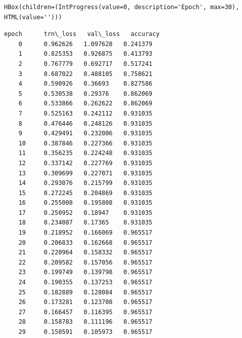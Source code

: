 \documentclass[11pt]{article}
\begin{document}
    
    \begin{verbatim}
HBox(children=(IntProgress(value=0, description='Epoch', max=30), HTML(value='')))
    \end{verbatim}

    
    \begin{Verbatim}[commandchars=\\\{\}]
epoch      trn\_loss   val\_loss   accuracy        
    0      0.962626   1.097628   0.241379  
    1      0.825353   0.926875   0.413793        
    2      0.767779   0.692717   0.517241        
    3      0.687022   0.488105   0.758621        
    4      0.590926   0.36693    0.827586        
    5      0.530538   0.29376    0.862069        
    6      0.533866   0.262622   0.862069        
    7      0.525163   0.242112   0.931035        
    8      0.476446   0.248126   0.931035        
    9      0.429491   0.232006   0.931035        
    10     0.387846   0.227366   0.931035        
    11     0.356235   0.224248   0.931035        
    12     0.337142   0.227769   0.931035        
    13     0.309699   0.227071   0.931035        
    14     0.293076   0.215799   0.931035        
    15     0.272245   0.204869   0.931035        
    16     0.255008   0.195808   0.931035        
    17     0.250952   0.18947    0.931035        
    18     0.234087   0.17365    0.931035        
    19     0.218952   0.166069   0.965517        
    20     0.206833   0.162668   0.965517        
    21     0.220964   0.158332   0.965517        
    22     0.209582   0.157056   0.965517        
    23     0.199749   0.139798   0.965517        
    24     0.190355   0.137253   0.965517        
    25     0.182889   0.128084   0.965517        
    26     0.173281   0.123708   0.965517        
    27     0.166457   0.116395   0.965517        
    28     0.158783   0.111196   0.965517        
    29     0.150591   0.105973   0.965517        


    \end{Verbatim}
\end{document}
